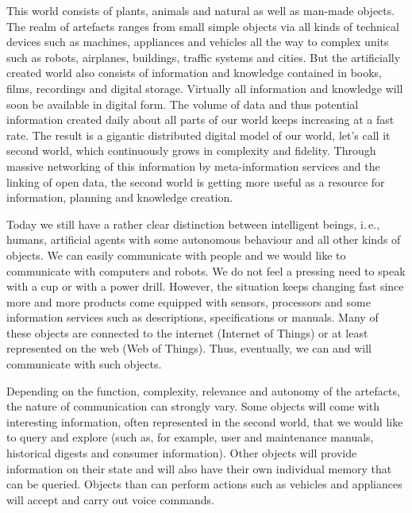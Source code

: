\documentclass[10pt, plain]{../../metanetpaper}
\begin{document}
\begin{multicols}{2}
This world consists of plants, animals and natural as well as man-made objects. The realm of artefacts ranges from small simple objects via all kinds of technical devices such as machines, appliances and vehicles all the way to complex units such as robots, airplanes, buildings, traffic systems and cities. But the artificially created world also consists of information and knowledge contained in books, films, recordings and digital storage. Virtually all information and knowledge will soon be available in digital form. The volume of data and thus potential information created daily about all parts of our world keeps increasing at a fast rate. The result is a gigantic distributed digital model of our world, let’s call it second world, which continuously grows in complexity and fidelity. Through massive networking of this information by meta-information services and the linking of open data, the second world is getting more useful as a resource for information, planning and knowledge creation. 
 
Today we still have a rather clear distinction between intelligent beings, i.\,e., humans, artificial agents with some autonomous behaviour and all other kinds of objects. We can easily communicate with people and we would like to communicate with computers and robots. We do not feel a pressing need to speak with a cup or with a power drill. However, the situation keeps changing fast since more and more products come equipped with sensors, processors and some information services such as descriptions, specifications or manuals. Many of these objects are connected to the internet (Internet of Things) or at least represented on the web (Web of Things). Thus, eventually, we can and will communicate with such objects.
 
Depending on the function, complexity, relevance and autonomy of the artefacts, the nature of communication can strongly vary. Some objects will come with interesting information, often represented in the second world, that we would like to query and explore (such as, for example, user and maintenance manuals, historical digests and consumer information). Other objects will provide information on their state and will also have their own individual memory that can be queried. Objects than can perform actions such as vehicles and appliances will accept and carry out voice commands. 
 
 

\end{multicols}
\end{document}
